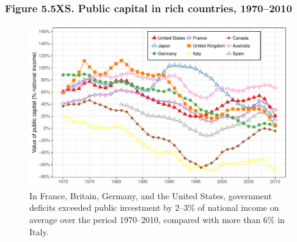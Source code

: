 \documentclass[t]{beamer}\usepackage[]{graphicx}\usepackage[]{color}
\newenvironment{knitrout}{}{} %
\begin{document}
\begin{frame}[label=Figure_5_5XS]
\frametitle{Figure 5.5XS. Public capital in rich countries, 1970--2010}
\begin{figure}[t]
\begin{minipage}[b]{\textwidth}
\centering
\begin{knitrout}\footnotesize
{}\color{fgcolor}

{\centering \includegraphics[width=1\linewidth]{figures/color/Figure_5_5XS} 

}



\end{knitrout}
\caption{In France, Britain, Germany, and the United States, government deficits exceeded public investment by 2--3\% of national income on average over the period 1970--2010, compared with more than 6\% in Italy.}
\end{minipage}
\end{figure}
\end{frame}
\end{document}
